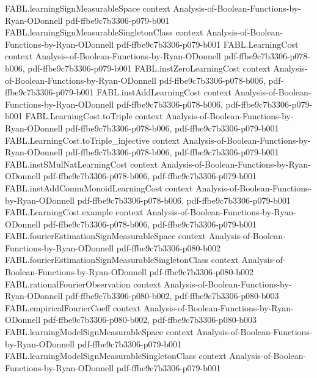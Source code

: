 \begin{theorem}
\proofstep
  {FABL.learningSignMeasurableSpace}
  {context}
  {Analysis-of-Boolean-Functions-by-Ryan-ODonnell}
  {pdf-ffbe9c7b3306-p079-b001}
\proofstep
  {FABL.learningSignMeasurableSingletonClass}
  {context}
  {Analysis-of-Boolean-Functions-by-Ryan-ODonnell}
  {pdf-ffbe9c7b3306-p079-b001}
\proofstep
  {FABL.LearningCost}
  {context}
  {Analysis-of-Boolean-Functions-by-Ryan-ODonnell}
  {pdf-ffbe9c7b3306-p078-b006,
    pdf-ffbe9c7b3306-p079-b001}
\proofstep
  {FABL.instZeroLearningCost}
  {context}
  {Analysis-of-Boolean-Functions-by-Ryan-ODonnell}
  {pdf-ffbe9c7b3306-p078-b006,
    pdf-ffbe9c7b3306-p079-b001}
\proofstep
  {FABL.instAddLearningCost}
  {context}
  {Analysis-of-Boolean-Functions-by-Ryan-ODonnell}
  {pdf-ffbe9c7b3306-p078-b006,
    pdf-ffbe9c7b3306-p079-b001}
\proofstep
  {FABL.LearningCost.toTriple}
  {context}
  {Analysis-of-Boolean-Functions-by-Ryan-ODonnell}
  {pdf-ffbe9c7b3306-p078-b006,
    pdf-ffbe9c7b3306-p079-b001}
\proofstep
  {FABL.LearningCost.toTriple_injective}
  {context}
  {Analysis-of-Boolean-Functions-by-Ryan-ODonnell}
  {pdf-ffbe9c7b3306-p078-b006,
    pdf-ffbe9c7b3306-p079-b001}
\proofstep
  {FABL.instSMulNatLearningCost}
  {context}
  {Analysis-of-Boolean-Functions-by-Ryan-ODonnell}
  {pdf-ffbe9c7b3306-p078-b006,
    pdf-ffbe9c7b3306-p079-b001}
\proofstep
  {FABL.instAddCommMonoidLearningCost}
  {context}
  {Analysis-of-Boolean-Functions-by-Ryan-ODonnell}
  {pdf-ffbe9c7b3306-p078-b006,
    pdf-ffbe9c7b3306-p079-b001}
\proofstep
  {FABL.LearningCost.example}
  {context}
  {Analysis-of-Boolean-Functions-by-Ryan-ODonnell}
  {pdf-ffbe9c7b3306-p078-b006,
    pdf-ffbe9c7b3306-p079-b001}
\proofstep
  {FABL.fourierEstimationSignMeasurableSpace}
  {context}
  {Analysis-of-Boolean-Functions-by-Ryan-ODonnell}
  {pdf-ffbe9c7b3306-p080-b002}
\proofstep
  {FABL.fourierEstimationSignMeasurableSingletonClass}
  {context}
  {Analysis-of-Boolean-Functions-by-Ryan-ODonnell}
  {pdf-ffbe9c7b3306-p080-b002}
\proofstep
  {FABL.rationalFourierObservation}
  {context}
  {Analysis-of-Boolean-Functions-by-Ryan-ODonnell}
  {pdf-ffbe9c7b3306-p080-b002,
    pdf-ffbe9c7b3306-p080-b003}
\proofstep
  {FABL.empiricalFourierCoeff}
  {context}
  {Analysis-of-Boolean-Functions-by-Ryan-ODonnell}
  {pdf-ffbe9c7b3306-p080-b002,
    pdf-ffbe9c7b3306-p080-b003}
\proofstep
  {FABL.learningModelSignMeasurableSpace}
  {context}
  {Analysis-of-Boolean-Functions-by-Ryan-ODonnell}
  {pdf-ffbe9c7b3306-p079-b001}
\proofstep
  {FABL.learningModelSignMeasurableSingletonClass}
  {context}
  {Analysis-of-Boolean-Functions-by-Ryan-ODonnell}
  {pdf-ffbe9c7b3306-p079-b001}
\proofstep

\end{theorem}
